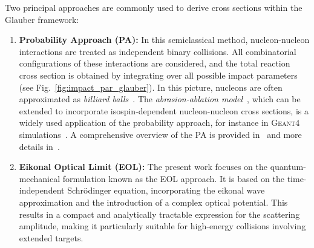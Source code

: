 Two principal approaches are commonly used to derive cross sections within the Glauber framework:
\begin{enumerate}
    \item \textbf{Probability Approach (PA):} In this semiclassical method, nucleon-nucleon interactions are treated as independent binary collisions. All combinatorial configurations of these interactions are considered, and the total reaction cross section is obtained by integrating over all possible impact parameters (see Fig.~\ref{fig:impact_par_glauber}). In this picture, nucleons are often approximated as \textit{billiard balls}~\cite{bertulani2019introduction}. The \textit{abrasion-ablation model}~\cite{hufner1975abrasion}, which can be extended to incorporate isospin-dependent nucleon-nucleon cross sections, is a widely used application of the probability approach, for instance in \textsc{Geant4} simulations~\cite{agostinelli2003geant4}. A comprehensive overview of the PA is provided in~\cite{schindler2017total} and more details in~\cite{bertulani2019introduction}.
    \item \textbf{Eikonal Optical Limit (EOL):} The present work focuses on the quantum-mechanical formulation known as the EOL approach. It is based on the time-independent Schr\"odinger equation, incorporating the eikonal wave approximation and the introduction of a complex optical potential. This results in a compact and analytically tractable expression for the scattering amplitude, making it particularly suitable for high-energy collisions involving extended targets.
\end{enumerate}

